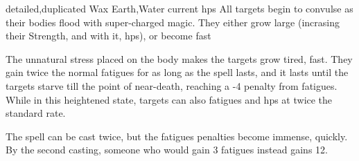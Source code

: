  {detailed,duplicated}%
  {Wax}%
  {Earth,Water}%
  {current \glspl{hp}}%
  {All  targets begin to convulse as their bodies flood with super-charged magic.
    They either grow large (incrasing their Strength, and with it, \glspl{hp}), or become fast}%
  {The unnatural stress placed on the body makes the targets grow tired, fast.
    They gain twice the normal \glspl{fatigue} for as long as the spell lasts, and it lasts until the targets starve till the point of near-death, reaching a -4 penalty from \glspl{fatigue}.
    While in this heightened state, targets can also \glspl{fatigue} and \glspl{hp} at twice the standard rate.

    The spell can be cast twice, but the \glspl{fatigue} penalties become immense, quickly.
    By the second casting, someone who would gain 3 \glspl{fatigue} instead gains 12.
  }
